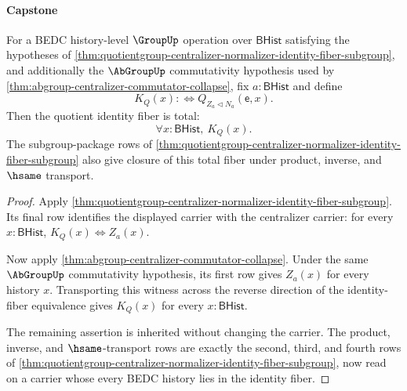\paragraph{Capstone}

\begin{theorem}
\label{thm:abelian-centralizer-normalizer-quotient-terminal-fiber}
For a BEDC history-level $\GroupUp$ operation over $\mathsf{BHist}$ satisfying
the hypotheses of
\autoref{thm:quotientgroup-centralizer-normalizer-identity-fiber-subgroup},
and additionally the $\AbGroupUp$ commutativity hypothesis used by
\autoref{thm:abgroup-centralizer-commutator-collapse}, fix
$a:\mathsf{BHist}$ and define
$$
K_Q(x) :\Longleftrightarrow Q_{Z_a\triangleleft N_a}(\mathsf{e},x).
$$
Then the quotient identity fiber is total:
$$
\forall x:\mathsf{BHist},\ K_Q(x).
$$
The subgroup-package rows of
\autoref{thm:quotientgroup-centralizer-normalizer-identity-fiber-subgroup}
also give closure of this total fiber under product, inverse, and $\hsame$
transport.
\end{theorem}
\begin{proof}
Apply
\autoref{thm:quotientgroup-centralizer-normalizer-identity-fiber-subgroup}.
Its final row identifies the displayed carrier with the centralizer carrier:
for every $x:\mathsf{BHist}$, $K_Q(x)\Longleftrightarrow Z_a(x)$.

Now apply \autoref{thm:abgroup-centralizer-commutator-collapse}. Under the
same $\AbGroupUp$ commutativity hypothesis, its first row gives $Z_a(x)$ for
every history $x$. Transporting this witness across the reverse direction of
the identity-fiber equivalence gives $K_Q(x)$ for every $x:\mathsf{BHist}$.

The remaining assertion is inherited without changing the carrier. The product,
inverse, and $\hsame$-transport rows are exactly the second, third, and fourth
rows of
\autoref{thm:quotientgroup-centralizer-normalizer-identity-fiber-subgroup},
now read on a carrier whose every BEDC history lies in the identity fiber.
\end{proof}


